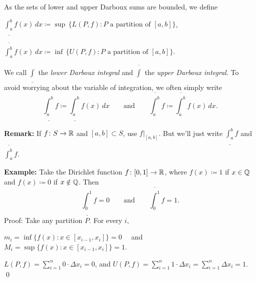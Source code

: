 \documentclass[10pt,aspectratio=149]{beamer}
\begin{document}
\begin{frame}

\begin{definition}
As the sets of lower and upper Darboux sums are bounded, we define

\pause
\medskip

\qquad
$\displaystyle
\underline{\int_a^b} f(x)\,dx \coloneqq
\sup \, \bigl\{ L(P,f) : P \text{ a partition of } [a,b] \bigr\}$,

\pause
\bigskip

\qquad
$\displaystyle
\overline{\int_a^b} f(x)\,dx \coloneqq
\inf \, \bigl\{ U(P,f) : P \text{ a partition of } [a,b] \bigr\}$.

\pause
\medskip

We call $\underline{\int}$
the \emph{lower Darboux integral} and
$\overline{\int}$
the \emph{upper Darboux integral}.
\pause
To avoid worrying about the variable of integration, 
we often simply write
\begin{equation*}
\underline{\int_a^b} f \coloneqq
\underline{\int_a^b} f(x)\,dx 
\qquad \text{and} \qquad
\overline{\int_a^b} f \coloneqq
\overline{\int_a^b} f(x)\,dx  .
\end{equation*}
\end{definition}

\pause
\textbf{Remark:}
If $f \colon S \to {\mathbb{R}}$ and $[a,b] \subset S$,
use $f|_{[a,b]}$.  But we'll just write
$\underline{\int_a^b} f$ and
$\overline{\int_a^b} f$.

\end{frame}

\begin{frame}

\textbf{Example:}
Take the Dirichlet function
$f \colon [0,1] \to {\mathbb{R}}$, where $f(x) \coloneqq 1$ if
$x \in {\mathbb{Q}}$ and $f(x) \coloneqq 0$ if $x \notin {\mathbb{Q}}$.
\pause
Then
\begin{equation*}
\underline{\int_0^1} f = 0 \qquad \text{and} \qquad
\overline{\int_0^1} f = 1 .
\end{equation*}
\pause
Proof: Take any partition $P$.
\pause
For every $i$,

$m_i = \inf \bigl\{ f(x) : x \in [x_{i-1},x_i] \bigr\} = 0$~~
\pause
and
~~$M_i = \sup \bigl\{ f(x) : x \in [x_{i-1},x_i] \bigr\} = 1$.

\pause
\medskip

\thus \quad
$\displaystyle
L(P,f) = \sum_{i=1}^n 0 \cdot \Delta x_i = 0$,
\pause
\quad and \quad
$\displaystyle
U(P,f) = \sum_{i=1}^n 1 \cdot \Delta x_i = \sum_{i=1}^n \Delta x_i = 1$.
\qed

\end{frame}
\end{document}
